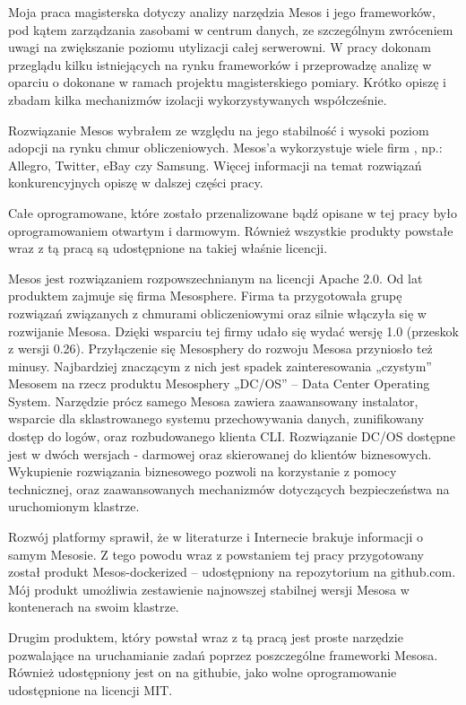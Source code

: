 \documentclass[10pt,a4paper,titlepage,twoside]{report}
\begin{document}
Moja praca magisterska dotyczy analizy narzędzia Mesos i jego frameworków, pod kątem zarządzania zasobami w centrum danych, ze szczególnym zwróceniem uwagi na zwiększanie poziomu utylizacji całej serwerowni. W pracy dokonam przeglądu kilku istniejących na rynku frameworków i przeprowadzę analizę w oparciu o dokonane w ramach projektu magisterskiego pomiary. Krótko opiszę i zbadam kilka mechanizmów izolacji wykorzystywanych współcześnie.

Rozwiązanie Mesos wybrałem ze względu na jego stabilność i wysoki poziom adopcji na rynku chmur obliczeniowych. Mesos’a wykorzystuje wiele firm \cite{ad16}, np.: Allegro, Twitter, eBay czy Samsung. Więcej informacji na temat rozwiązań konkurencyjnych opiszę w dalszej części pracy.

Całe oprogramowane, które zostało przenalizowane bądź opisane w tej pracy było oprogramowaniem otwartym i darmowym. Również wszystkie produkty powstałe wraz z tą pracą są udostępnione na takiej właśnie licencji.

Mesos jest rozwiązaniem rozpowszechnianym na licencji Apache 2.0. Od lat produktem zajmuje się firma Mesosphere. Firma ta przygotowała grupę rozwiązań związanych z chmurami obliczeniowymi oraz silnie włączyła się w rozwijanie Mesosa. Dzięki wsparciu tej firmy udało się wydać wersję 1.0 (przeskok z wersji 0.26). Przyłączenie się Mesosphery do rozwoju Mesosa przyniosło też minusy. Najbardziej znaczącym z nich jest spadek zainteresowania „czystym” Mesosem na rzecz produktu Mesosphery „DC/OS” – Data Center Operating System. Narzędzie prócz samego Mesosa zawiera zaawansowany instalator, wsparcie dla sklastrowanego systemu przechowywania danych, zunifikowany dostęp do logów, oraz rozbudowanego klienta CLI. Rozwiązanie DC/OS dostępne jest w dwóch wersjach - darmowej oraz skierowanej do klientów biznesowych. Wykupienie rozwiązania biznesowego pozwoli na korzystanie z pomocy technicznej, oraz zaawansowanych mechanizmów dotyczących bezpieczeństwa na uruchomionym klastrze.

Rozwój platformy sprawił, że w literaturze i Internecie brakuje informacji o samym Mesosie. Z tego powodu wraz z powstaniem tej pracy przygotowany został produkt Mesos-dockerized – udostępniony na repozytorium na github.com. Mój produkt umożliwia zestawienie najnowszej stabilnej wersji Mesosa w kontenerach na swoim klastrze.

Drugim produktem, który powstał wraz z tą pracą jest proste narzędzie pozwalające na uruchamianie zadań poprzez poszczególne frameworki Mesosa. Również udostępniony jest on na githubie, jako wolne oprogramowanie udostępnione na licencji MIT.
\end{document}
